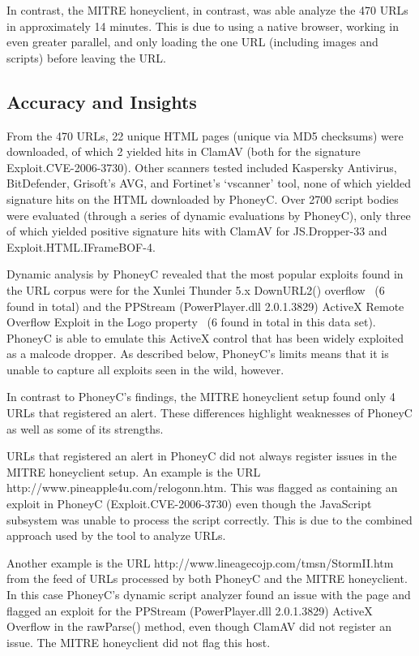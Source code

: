 \documentclass[10pt,twocolumn]{article}
\begin{document}
In contrast, the MITRE honeyclient, in contrast, was able analyze the 470 URLs in approximately 14 minutes. This is due to using a native browser, working in even greater parallel, and only loading the one URL (including images and scripts) before leaving the URL. 

\subsection{Accuracy and Insights}
\label{accuracy}

From the 470 URLs, 22 unique HTML pages (unique via MD5 checksums) were downloaded, of which 2 yielded hits in ClamAV (both for the signature Exploit.CVE-2006-3730).  Other scanners tested included Kaspersky Antivirus, BitDefender, Grisoft's AVG, and Fortinet's `vscanner' tool, none of which yielded signature hits on the HTML downloaded by PhoneyC. Over 2700 script bodies were evaluated (through a series of dynamic evaluations by PhoneyC), only three of which yielded positive signature hits with ClamAV for JS.Dropper-33 and Exploit.HTML.IFrameBOF-4. 

Dynamic analysis by PhoneyC revealed that the most popular exploits found in the URL corpus were for the Xunlei Thunder 5.x DownURL2() overflow~\cite{xinlei} (6 found in total) and the PPStream (PowerPlayer.dll 2.0.1.3829) ActiveX Remote Overflow Exploit in the Logo property~\cite{pplayer:ex} (6 found in total in this data set). PhoneyC is able to emulate this ActiveX control that has been widely exploited as a malcode dropper. As described below, PhoneyC's limits means that it is unable to capture all exploits seen in the wild, however. 

In contrast to PhoneyC's findings, the MITRE honeyclient setup found only 4 URLs that registered an alert. These differences highlight weaknesses of PhoneyC as well as some of its strengths.

URLs that registered an alert in PhoneyC did not always register issues in the MITRE honeyclient setup. An example is the URL http://www.pineapple4u.com/relogonn.htm. This was flagged as containing an exploit in PhoneyC (Exploit.CVE-2006-3730) even though the JavaScript subsystem was unable to process the script correctly. This is due to the combined approach used by the tool to analyze URLs. 

Another example is the URL http://www.lineagecojp.com/tmsn/StormII.htm from the feed of URLs processed by both PhoneyC and the MITRE honeyclient. In this case PhoneyC's dynamic script analyzer found an issue with the page and flagged an exploit for the PPStream (PowerPlayer.dll 2.0.1.3829) ActiveX Overflow in the rawParse() method, even though ClamAV did not register an issue. The MITRE honeyclient did not flag this host. 
\end{document}
